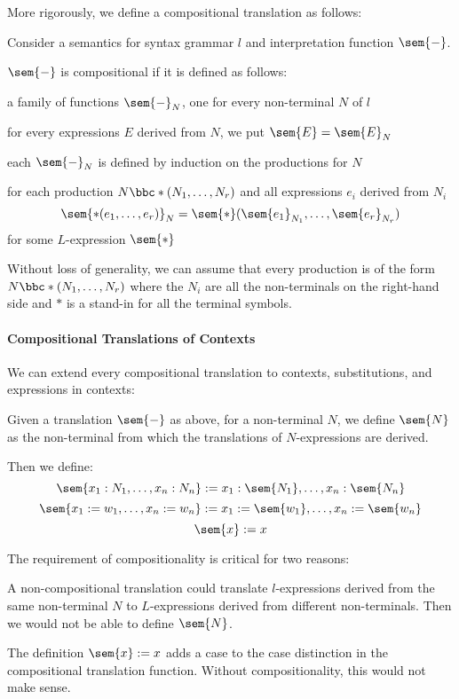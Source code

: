 More rigorously, we define a compositional translation as follows:
\begin{definition}
Consider a semantics for syntax grammar $l$ and interpretation function $\sem{-}$.

$\sem{-}$ is compositional if it is defined as follows:
\begin{compactitem}
 \item a family of functions $\sem{-}_N$, one for every non-terminal $N$ of $l$
 \item for every expressions $E$ derived from $N$, we put $\sem{E}=\sem{E}_N$
 \item each $\sem{-}_N$ is defined by induction on the productions for $N$
 \item for each production $N\bbc *(N_1,\ldots,N_r)$ and all expressions $e_i$ derived from $N_i$
   \[\sem{*(e_1,\ldots,e_r)}_N=\sem{*}(\sem{e_1}_{N_1},\ldots,\sem{e_r}_{N_r})\]
   for some $L$-expression $\sem{*}$
\end{compactitem}

Without loss of generality, we can assume that every production is of the form $N\bbc *(N_1,\ldots,N_r)$ where the $N_i$ are all the non-terminals on the right-hand side and $*$ is a stand-in for all the terminal symbols.
\end{definition}

\paragraph{Compositional Translations of Contexts}
We can extend every compositional translation to contexts, substitutions, and expressions in contexts:

\begin{definition}
Given a translation $\sem{-}$ as above, for a non-terminal $N$, we define $\sem{N}$ as the non-terminal from which the translations of $N$-expressions are derived.

Then we define:
\[\sem{x_1:N_1,\ldots,x_n:N_n}:=x_1:\sem{N_1},\ldots,x_n:\sem{N_n}\]
\[\sem{x_1:=w_1,\ldots,x_n:=w_n}:=x_1:=\sem{w_1},\ldots,x_n:=\sem{w_n}\]
\[\sem{x}:=x\]
\end{definition}

The requirement of compositionality is critical for two reasons:
\begin{compactitem}
\item A non-compositional translation could translate $l$-expressions derived from the same non-terminal $N$ to $L$-expressions derived from different non-terminals. Then we would not be able to define $\sem{N}$.
\item The definition $\sem{x}:=x$ adds a case to the case distinction in the compositional translation function.
Without compositionality, this would not make sense.
\end{compactitem}

